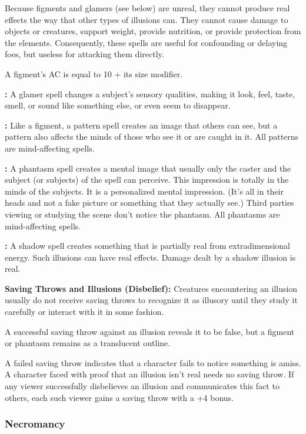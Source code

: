Because figments and glamers (see below) are unreal, they cannot produce real effects 
the way that other types of illusions can. They cannot cause damage to objects 
or creatures, support weight, provide nutrition, or provide protection from the 
elements. Consequently, these spells are useful for confounding or delaying foes, 
but useless for attacking them directly. 

A figment's AC is equal to 10 + its size modifier.

\textbf{:} A glamer spell changes a subject's sensory qualities, making it 
look, feel, taste, smell, or sound like something else, or even seem to disappear.

\textbf{:} Like a figment, a pattern spell creates an image that others 
can see, but a pattern also affects the minds of those who see it or are caught 
in it. All patterns are mind-affecting spells.

\textbf{:} A phantasm spell creates a mental image that usually only the 
caster and the subject (or subjects) of the spell can perceive. This impression 
is totally in the minds of the subjects. It is a personalized mental impression. 
(It's all in their heads and not a fake picture or something that they actually 
see.) Third parties viewing or studying the scene don't notice the phantasm. All 
phantasms are mind-affecting spells.

\textbf{:} A shadow spell creates something that is partially real from extradimensional 
energy. Such illusions can have real effects. Damage dealt by a shadow illusion 
is real.

\textbf{Saving Throws and Illusions (Disbelief):} Creatures encountering an illusion 
usually do not receive saving throws to recognize it as illusory until they study 
it carefully or interact with it in some fashion.

A successful saving throw against an illusion reveals it to be false, but a figment 
or phantasm remains as a translucent outline.

A failed saving throw indicates that a character fails to notice something is amiss. 
A character faced with proof that an illusion isn't real needs no saving throw. 
If any viewer successfully disbelieves an illusion and communicates this fact to 
others, each such viewer gains a saving throw with a +4 bonus.

\subsubsection{Necromancy}


